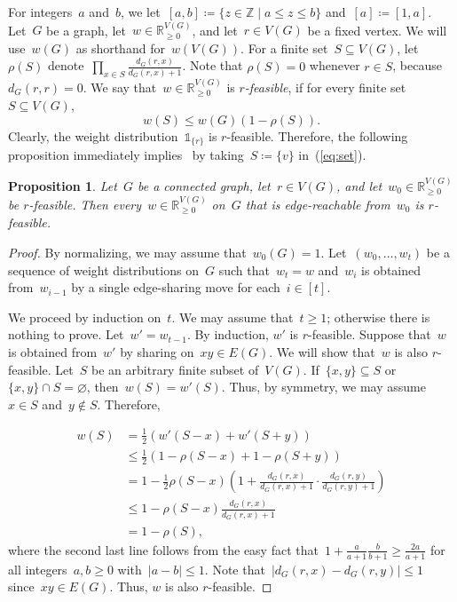 \documentclass[reqno, 12pt]{amsart}
\numberwithin{equation}{section}
\numberwithin{figure}{section}
\theoremstyle{plain}
\newtheorem{proposition}[thm]{Proposition}
\theoremstyle{definition}
\let\emptyset=\varnothing
\newcommand*{\abs}[1]{\ensuremath{{\left\lvert {#1} \right\rvert}}}
\newcommand*{\weights}{\ensuremath{\mathbb{R}_{\geq 0}^{V(G)}}}
\begin{document}
 
For integers~$a$ and~$b$, we let~${[a,b] \coloneqq \{z \in \mathbb{Z} \mid a \leq z \leq b\}}$ and~${[a] \coloneqq [1,a]}$. 
Let~$G$ be a graph, let~${w \in \weights}$, and let~${r \in V(G)}$ be a fixed vertex. We will use~${w(G)}$ as shorthand for~${w(V(G))}$. 
For a finite set~${S \subseteq V(G)}$, let~$\rho(S)$ denote~${\prod_{x \in S} \frac{d_G(r,x)}{d_G(r,x)+1}}$. 
Note that $\rho(S)=0$ whenever $r\in S$, because $d_G(r,r)=0$.
We say that~${w \in \weights}$ is \emph{$r$-feasible}, if for every finite set~${S \subseteq V(G)}$, 
\begin{equation}
    \label{eq:set}
     w(S) \leq w(G) \left( 1 - \rho(S) \right).
\end{equation}
Clearly, the weight distribution~$\mathds{1}_{\{r\}}$ is $r$-feasible. 
Therefore, the following proposition immediately implies~ by taking~${S \coloneqq \{v\}}$ in~(\ref{eq:set}). 

\begin{proposition}
    \label{prop:main}
    Let~$G$ be a connected graph, let~${r \in V(G)}$, and let~${w_0 \in \weights}$ be $r$-feasible.  
    Then every~${w \in \weights}$ on~$G$ that is edge-reachable from~$w_0$ is $r$-feasible. 
\end{proposition}

\begin{proof}
    By normalizing, we may assume that~${w_0(G) = 1}$. 
    Let~${(w_0, \dots, w_t)}$ be a sequence of weight distributions on~$G$ such that~${w_t = w}$ and~$w_i$ is obtained from~$w_{i-1}$ by a single edge-sharing move for each~${i \in [t]}$. 
    
    We proceed by induction on~$t$. 
    We may assume that~${t \geq 1}$; 
    otherwise there is nothing to prove. 
    Let~${w' = w_{t-1}}$. 
    By induction, $w'$ is $r$-feasible. 
    Suppose that~$w$ is obtained from~$w'$ by sharing on~${xy \in E(G)}$. 
    We will show that~$w$ is also $r$-feasible. 
    Let~$S$ be an arbitrary finite subset of~${V(G)}$. 
    If~${\{x,y\} \subseteq S}$ or~${\{x,y\} \cap S = \emptyset}$, then~${w(S) = w'(S)}$. 
    Thus, by symmetry, we may assume~${x \in S}$ and~${y \notin S}$.  
    Therefore,

    \begin{align*}
        w(S)
        &= \frac{1}{2} \left( w'(S-x) + w'(S+y) \right) \\
        &\leq \frac{1}{2} \left( 1- \rho(S-x) + 1-\rho(S+y) \right) \\
        &= 1 - \frac{1}{2} \rho(S-x) \left(1+\frac{d_G(r,x)}{d_G(r,x)+1} \cdot \frac{d_G(r,y)}{d_G(r,y)+1}\right) \\
        & \leq 1 - \rho (S-x)\frac{d_G(r,x)}{d_G(r,x)+1} \\
        &=1- \rho(S),
    \end{align*}
    where the second last line follows from the easy fact that~${1+\frac{a}{a+1}\frac{b}{b+1} \geq \frac{2a}{a+1}}$ for all integers~${a,b \geq 0}$ with~${\abs{a-b} \leq 1}$. 
    Note that~${\abs{d_G(r,x)-d_G(r,y)} \leq 1}$ since~${xy \in E(G)}$. 
    Thus, $w$ is also $r$-feasible.  
\end{proof}
\end{document}
